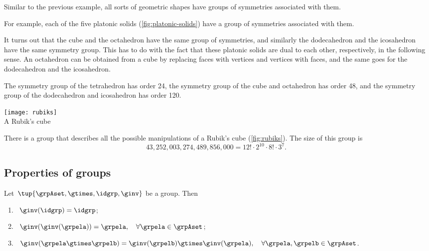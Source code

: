 
\begin{example}
Similar to the previous example, all sorts of geometric shapes have groups of symmetries associated with them. 

For example, each of the five platonic solids (\cref{fig:platonic-solids}) have a group of symmetries associated with them. 

It turns out that the cube and the octahedron have the same group of symmetries, and similarly the dodecahedron and the icosahedron have the same symmetry group. This has to do with the fact that these platonic solids are dual to each other, respectively, in the following sense. An octahedron can be obtained from a cube by replacing faces with vertices and vertices with faces, and the same goes for the dodecahedron and the icosahedron.

The symmetry group of the tetrahedron has order 24, the symmetry group of the cube and octahedron has order 48, and the symmetry group of the dodecahedron and icosahedron has order 120.
\end{example}

\begin{marginfigure}
\centering
\texttt{[image: rubiks]} \\
    \caption{A Rubik's cube}
    \label{fig:rubiks}
\end{marginfigure}

\begin{example}
There is a group that describes all the possible manipulations of a Rubik's cube (\cref{fig:rubiks}). The size of this group is 
\begin{equation*}
43,252,003,274,489,856,000 = 12! \cdot 2^{10} \cdot 8! \cdot 3^7.
\end{equation*}
\end{example}



\subsection{Properties of groups}


\begin{lemma}
    \label{lem:inv-op-properties}
    Let~$\tup{\grpAset, \gtimes, \idgrp, \ginv}$ be a group.
    Then
    \begin{enumerate}
        \item\label{eq:group-neutral-invariant}~$\ginv(\idgrp) = \idgrp$;
        \item\label{eq:group-inverse-inverse}~$ \ginv(\ginv(\grpela)) = \grpela, \quad \forall \grpela \in \grpAset$;
        \item\label{eq:group-inverse-of-composition}~$\ginv(\grpela \gtimes \grpelb ) = \ginv(\grpelb) \gtimes \ginv(\grpela), \quad \forall \grpela, \grpelb \in \grpAset$.
    \end{enumerate}
\end{lemma}

